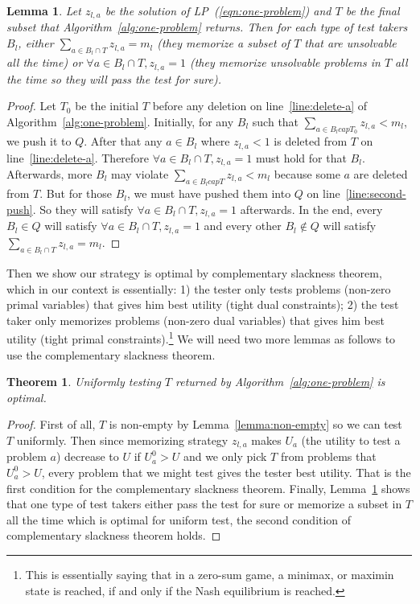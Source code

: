 \documentclass{article}
\newtheorem{theorem}{Theorem}
\newtheorem{lemma}{Lemma}
\begin{document}
\begin{lemma}\label{lemma:best-response}
Let $z_{l,a}$ be the solution of LP~(\ref{eqn:one-problem}) and $T$ be the final
subset that Algorithm~\ref{alg:one-problem} returns. Then for each type of test
takers $B_l$, either $\sum_{a \in B_l \cap T} z_{l,a} = m_l$ (they memorize a
subset of $T$ that are unsolvable all the time) or $\forall a \in B_l \cap T,
z_{l, a} = 1$ (they memorize unsolvable problems in $T$ all the time so they
will pass the test for sure).
\end{lemma}
\begin{proof}
Let $T_0$ be the initial $T$ before any deletion on line~\ref{line:delete-a} of
Algorithm~\ref{alg:one-problem}.  Initially, for any $B_l$ such that $\sum_{a
\in B_l cap T_0} z_{l,a} < m_l$, we push it to $Q$. After that any $a \in B_l$
where $z_{l,a} < 1$ is deleted from $T$ on line~\ref{line:delete-a}. Therefore
$\forall a \in B_l \cap T, z_{l,a} = 1$ must hold for that $B_l$. Afterwards,
more $B_l$ may violate $\sum_{a \in B_l cap T} z_{l,a} < m_l$ because some $a$
are deleted from $T$.  But for those $B_l$, we must have pushed them into $Q$
on line~\ref{line:second-push}. So they will satisfy $\forall a \in B_l \cap T,
z_{l,a} = 1$ afterwards. In the end, every $B_l \in Q$ will satisfy $\forall a
\in B_l \cap T, z_{l,a} = 1$ and every other $B_l \notin Q$ will satisfy
$\sum_{a \in B_l \cap T} z_{l,a} = m_l$.
\end{proof}

Then we show our strategy is optimal by complementary slackness theorem, which
in our context is essentially: 1) the tester only tests problems (non-zero
primal variables) that gives him best utility (tight dual constraints); 2) the
test taker only memorizes problems (non-zero dual variables) that gives him
best utility (tight primal constraints).\footnote{This is essentially saying
that in a zero-sum game, a minimax, or maximin state is reached, if and only if
the Nash equilibrium is reached.} We will need two more lemmas as follows to
use the complementary slackness theorem.

\begin{theorem}
Uniformly testing $T$ returned by Algorithm~\ref{alg:one-problem} is optimal.
\end{theorem}
\begin{proof}
First of all, $T$ is non-empty by Lemma~\ref{lemma:non-empty} so we can test
$T$ uniformly. Then since memorizing strategy $z_{l,a}$ makes $U_a$ (the
utility to test a problem $a$) decrease to $U$ if $U^0_a > U$ and we only pick
$T$ from problems that $U^0_a > U$, every problem that we might test gives the
tester best utility. That is the first condition for the complementary
slackness theorem.  Finally, Lemma~\ref{lemma:best-response} shows that one
type of test takers either pass the test for sure or memorize a subset in $T$
all the time which is optimal for uniform test, the second condition of
complementary slackness theorem holds.
\end{proof}
\end{document}
